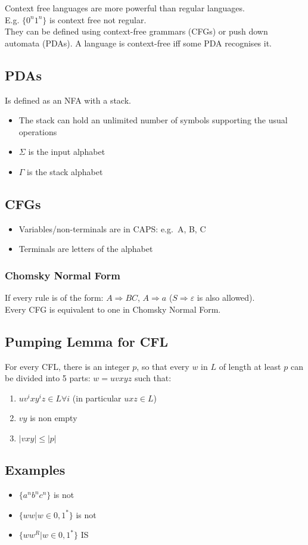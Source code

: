 Context free languages are more powerful than regular languages.\\
E.g. $\{0^n1^n\}$ is context free not regular.\\
They can be defined using context-free grammars (CFGs) or push down automata (PDAs). A language is context-free iff some PDA recognises it.
\subsection{PDAs}
Is defined as an NFA with a stack.
\begin{itemize}
\item The stack can hold an unlimited number of symbols supporting the usual operations
\item $\Sigma$ is the input alphabet
\item $\Gamma$ is the stack alphabet
\end{itemize}

\subsection{CFGs}
\begin{itemize}
    \item Variables/non-terminals are in CAPS: e.g.\ A, B, C
    \item Terminals are letters of the alphabet
\end{itemize}
\subsubsection{Chomsky Normal Form}
If every rule is of the form: $A\Rightarrow BC$, $A\Rightarrow a$ ($S\Rightarrow \varepsilon$ is also allowed).\\
Every CFG is equivalent to one in Chomsky Normal Form.

\subsection{Pumping Lemma for CFL}
For every CFL, there is an integer $p$, so that every $w$ in $L$ of length at least $p$ can be divided into 5 parts: $w=uvxyz$ such that:
\begin{enumerate}
    \item $uv^ixy^iz\in L \forall i$ (in particular $uxz\in L$)
    \item $vy$ is non empty
    \item $|vxy| \leq |p|$
\end{enumerate}

\subsection{Examples}
\begin{itemize}
    \item $\{a^nb^nc^n\}$ is not
    \item $\{ww|w\in {0,1}^*\}$ is not
    \item $\{ww^R|w\in{0,1}^*\}$ IS
\end{itemize}

